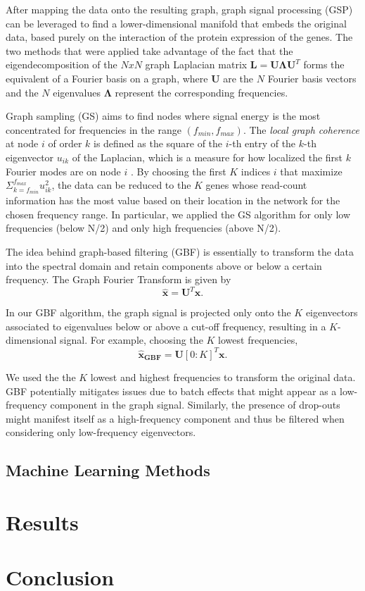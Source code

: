 \documentclass[10pt,conference,compsocconf]{IEEEtran}
\begin{document}
After mapping the data onto the resulting graph, graph signal processing (GSP) can be leveraged to find a lower-dimensional manifold that embeds the original data, based purely on the interaction of the protein expression of the genes. The two methods that were applied take advantage of the fact that the eigendecomposition of the $N x N$ graph Laplacian matrix $\boldsymbol{L} = \boldsymbol{U\Lambda U}^T$ forms the equivalent of a Fourier basis on a graph, where $\boldsymbol{U}$ are the $N$ Fourier basis vectors and the $N$ eigenvalues $\boldsymbol{\Lambda}$ represent the corresponding frequencies.
 \par
Graph sampling (GS) aims to find nodes where signal energy is the most concentrated for frequencies in the range $(f_{min}, f_{max})$. The \textit{local graph coherence} at node $i$ of order $k$ is defined as the square of the $i$-th entry of the $k$-th eigenvector $u_{ik}$ of the Laplacian, which is a measure for how localized the first $k$ Fourier modes are on node $i$ \cite{Puy2018}. By choosing the first $K$ indices $i$ that maximize $\Sigma_{k=f_{min}}^{f_{max}} u_{ik}^2$, the data can be reduced to the $K$ genes whose read-count information has the most value based on their location in the network for the chosen frequency range. In particular, we applied the GS algorithm for only low frequencies (below N/2) and only high frequencies (above N/2). 
\par
The idea behind graph-based filtering (GBF) is essentially to transform the data into the spectral domain and retain components above or below a certain frequency. The Graph Fourier Transform is given by
\begin{equation}
\boldsymbol{\hat{x}} = \boldsymbol{U}^T \boldsymbol{x}.
\end{equation}
\par
In our GBF algorithm, the graph signal is projected only onto the $K$ eigenvectors associated to eigenvalues below or above a cut-off frequency, resulting in a $K$-dimensional signal. For example, choosing the $K$ lowest frequencies,
\begin{equation}
\boldsymbol{\hat{x}_{GBF}} = \boldsymbol{U}[0:K]^T \boldsymbol{x}.
\end{equation} 
\par
We used the the $K$ lowest and highest frequencies to transform the original data. GBF potentially mitigates issues due to batch effects that might appear as a low-frequency component in the graph signal. Similarly, the presence of drop-outs might manifest itself as a high-frequency component and thus be filtered when considering only low-frequency eigenvectors.

\subsection{Machine Learning Methods}


\section*{Results}

\section*{Conclusion}



\end{document}
